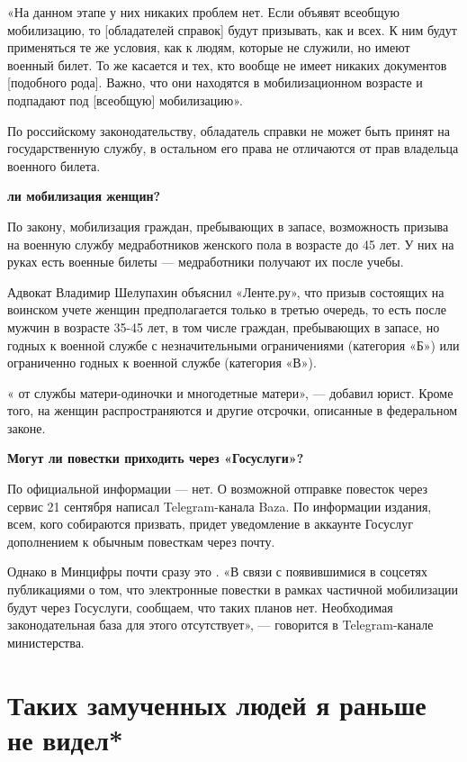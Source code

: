 «На данном этапе у них никаких проблем нет. Если объявят всеобщую мобилизацию, то [обладателей справок] будут призывать, как и всех. К ним будут применяться те же условия, как к людям, которые не служили, но имеют военный билет. То же касается и тех, кто вообще не имеет никаких документов [подобного рода]. Важно, что они находятся в мобилизационном возрасте и подпадают под [всеобщую] мобилизацию».

По российскому законодательству, обладатель справки не может быть принят на государственную службу, в остальном его права не отличаются от прав владельца военного билета.

\textbf{ ли мобилизация женщин?}

По закону, мобилизация граждан, пребывающих в запасе,  возможность призыва на военную службу медработников женского пола в возрасте до 45 лет. У них на руках есть военные билеты — медработники получают их после учебы.

Адвокат Владимир Шелупахин объяснил «Ленте.ру», что призыв состоящих на воинском учете женщин предполагается только в третью очередь, то есть после мужчин в возрасте 35-45 лет, в том числе граждан, пребывающих в запасе, но годных к военной службе с незначительными ограничениями (категория «Б») или ограниченно годных к военной службе (категория «В»).

«  от службы матери-одиночки и многодетные матери», — добавил юрист. Кроме того, на женщин распространяются и другие отсрочки, описанные в федеральном законе.

\textbf{Могут ли повестки приходить через «Госуслуги»?}

По официальной информации — нет. О возможной отправке повесток через сервис  21 сентября написал Telegram-канала Baza. По информации издания, всем, кого собираются призвать, придет уведомление в аккаунте Госуслуг дополнением к обычным повесткам через почту.

Однако в Минцифры почти сразу это . «В связи с появившимися в соцсетях публикациями о том, что электронные повестки в рамках частичной мобилизации будут  через Госуслуги, сообщаем, что таких планов нет. Необходимая законодательная база для этого отсутствует», — говорится в Telegram-канале министерства.

\newpage
\section{Таких замученных людей я раньше не видел*}

